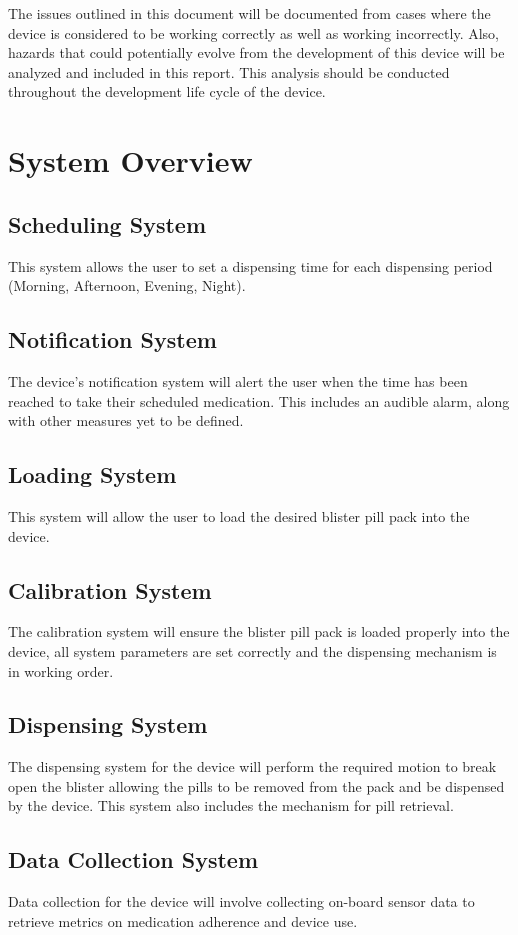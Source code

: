\documentclass[12pt,titlepage]{article}
\begin{document}
The issues outlined in this document will be documented from cases where the device is considered to be working correctly as well as working incorrectly. Also, hazards that could potentially evolve from the development of this device will be analyzed and included in this report. This analysis should be conducted throughout the development life cycle of the device. 



\section{System Overview}
\subsection{Scheduling System}
This system allows the user to set a dispensing time for each dispensing period (Morning, Afternoon, Evening, Night).
\subsection{Notification System}
The device's notification system will alert the user when the time has been reached to take their scheduled medication. This includes an audible alarm, along with other measures yet to be defined.
\subsection{Loading System}
This system will allow the user to load the desired blister pill pack into the device.
\subsection{Calibration System}
The calibration system will ensure the blister pill pack is loaded properly into the device, all system parameters are set correctly and the dispensing mechanism is in working order. 
\subsection{Dispensing System}
The dispensing system for the device will perform the required motion to break open the blister allowing the pills to be removed from the pack and be dispensed by the device. This system also includes the mechanism for pill retrieval.
\subsection{Data Collection System}
Data collection for the device will involve collecting on-board sensor data to retrieve metrics on medication adherence and device use. 
\end{document}
